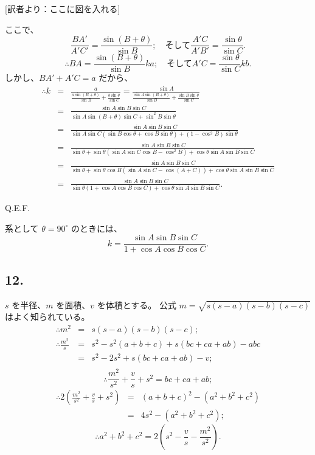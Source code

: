 [訳者より：ここに図を入れる]

ここで、
\[
\frac{BA'}{A'C'} = \frac{\sin (B + \theta)}{\sin B};
\quad \mbox{そして}
\frac{A'C}{A'B'} = \frac{\sin \theta}{\sin C}.
\]
\[
\therefore
BA = \frac{\sin (B + \theta)}{\sin B} ka;
\quad \mbox{そして}
A'C = \frac{\sin \theta}{\sin C} kb.
\]
しかし、$BA' + A'C = a$ だから、
\begin{eqnarray*}
\therefore
k
&=&
\frac{a}
    {\frac{a \sin (B + \theta)}{\sin B} + \frac{b \sin \theta}{\sin C}}
=
\frac{\sin A}
    {\frac{\sin A \sin (B + \theta)}{\sin B} + \frac{\sin B \sin \theta}{\sin C}}\\
&=&
\frac{\sin A \sin B \sin C}
 {\sin A \sin (B + \theta) \sin C + \sin^2 B \sin \theta}\\
&=&
\frac{\sin A \sin B \sin C}
 {\sin A \sin C (\sin B \cos \theta + \cos B \sin \theta)
 + (1 - \cos^2 B) \sin \theta}\\
&=&
\frac{\sin A \sin B \sin C}
 {\sin \theta + \sin \theta (\sin A \sin C \cos B - \cos^2 B)
  + \cos \theta \sin A \sin B \sin C}\\
&=&
\frac{\sin A \sin B \sin C}
 {\sin \theta + \sin \theta \cos B (\sin A \sin C - \cos (A + C))
 + \cos \theta \sin A \sin B \sin C}\\
&=&
\frac{\sin A \sin B \sin C}
 {\sin \theta (1 + \cos A \cos B \cos C) + \cos \theta \sin A \sin B \sin C}.
\end{eqnarray*}

Q.E.F.

系として $\theta = 90^\circ$ のときには、
\[
k = \frac{\sin A \sin B \sin C}{1 + \cos A \cos B \cos C}.
\]

\subsection*{12.}

$s$ を半径、$m$ を面積、$v$ を体積とする。
公式 $m = \sqrt{s(s-a)(s-b)(s-c)}$ はよく知られている。
\begin{eqnarray*}
\therefore
m^2 &=& s(s-a)(s-b)(s-c);\\
\therefore
\frac{m^2}{s}
&=& s^2 - s^2(a + b + c) + s(bc + ca + ab) - abc\\
&=& s^2 - 2s^2 + s(bc + ca + ab) - v;\\
\end{eqnarray*}
\[
\therefore
\frac{m^2}{s^2} + \frac{v}{s} + s^2
 = bc + ca + ab;
\]
\begin{eqnarray*}
\therefore
2 \left(\frac{m^2}{s^2} + \frac{v}{s} + s^2 \right)
&=& (a + b + c)^2 - (a^2 + b^2 + c^2)\\
&=& 4s^2 - (a^2 + b^2 + c^2);
\end{eqnarray*}
\[
\therefore
a^2 + b^2 + c^2 =
2 \left( s^2 - \frac{v}{s} - \frac{m^2}{s^2} \right).
\]

